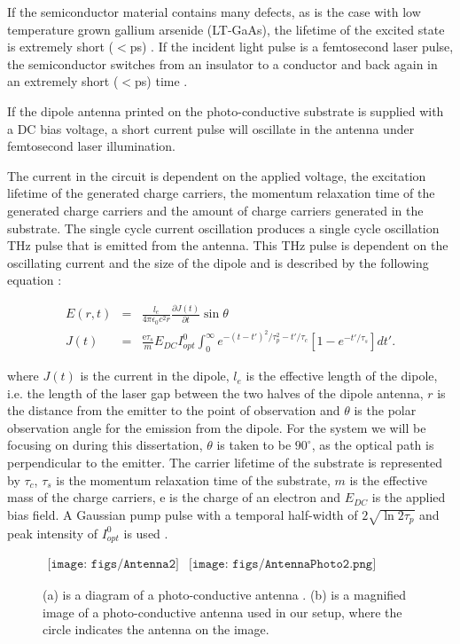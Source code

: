 If the semiconductor material contains many defects, as is the case with low temperature grown gallium arsenide (LT-GaAs), the lifetime of the excited state is extremely short ($<$ps) \cite{Sakai-2005}. 
If the incident light pulse is a femtosecond laser pulse, the semiconductor switches from an insulator to a conductor and back again in an extremely short ($<$ps)  time \cite{Sakai-2005}.

If the dipole antenna printed on the photo-conductive substrate is supplied with a DC bias voltage, a short current pulse will oscillate in the antenna under femtosecond laser illumination. 

The current in the circuit is dependent on the applied voltage, the excitation lifetime of the generated charge carriers, the momentum relaxation time of the generated charge carriers and the amount of charge carriers generated in the substrate. The single cycle current oscillation produces a single cycle oscillation THz pulse that is emitted from the antenna. This THz pulse is dependent on the oscillating current and the size of the dipole and is described by the following equation \cite{Sakai-2005}:

\begin{eqnarray}
E(r,t) &=& \frac{l_{e}}{4\pi\epsilon_{0} c^{2} r}\frac{\partial J(t)}{\partial t}\sin{\theta}\label{eq:E0sim}\\
J(t) &=& \frac{\text{e}\tau_{s}}{m}E_{DC}I_{opt}^{0}\int_{0}^{\infty}e^{-(t-t')^{2}/\tau_{p}^{2}-t'/\tau_{c}}[1-e^{-t'/\tau_{s}}]dt'.
\label{eq:J0sim}
\end{eqnarray}

where $J(t)$ is the current in the dipole, $l_{e}$ is the effective length of the dipole, i.e. the length of the laser gap between the two halves of the dipole antenna, $r$ is the distance from the emitter to the point of observation and $\theta$ is the polar observation angle for the emission from the dipole. For the  system we will be focusing on during this dissertation, $\theta$ is taken to be $90^{\circ}$, as the optical path is perpendicular to the emitter. The carrier lifetime of the substrate is represented by $\tau_{c}$, $\tau_{s}$ is the momentum relaxation time of the substrate, $m$ is the effective mass of the charge carriers, e is the charge of an electron and $E_{DC}$ is the applied bias field. A Gaussian pump pulse with a temporal half-width of $2\sqrt{\ln{2}\tau_{p}}$ and peak intensity of $I_{opt}^{0}$ is used \cite{Sakai-2005}. 

\begin{figure}[H]
                \begin{center}$
								\begin{array}{cc}
                \texttt{[image: figs/Antenna2]}&
                \texttt{[image: figs/AntennaPhoto2.png]}
								\end{array}$
								\end{center}
	\caption[Photo-conductive antenna diagram and image]{(a) is a diagram of a photo-conductive antenna \cite{Sakai-2005}. (b) is a magnified image of a photo-conductive antenna used in our setup, where the circle indicates the antenna on the image.}
	\label{fig:PhoAnt}
\end{figure}

